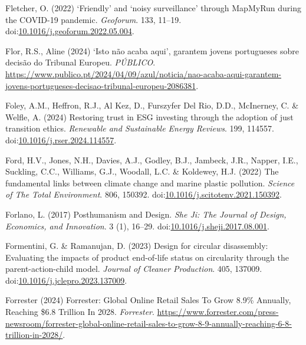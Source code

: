 \documentclass[
  letterpaper,
  DIV=11,
  numbers=noendperiod]{scrartcl}
\newlength{\cslhangindent}
\newenvironment{CSLReferences}[2] %
 {\begin{list}{}{%
  \setlength{\itemindent}{0pt}
  \setlength{\leftmargin}{0pt}
  \setlength{\parsep}{0pt}
  \ifodd #1
   \setlength{\leftmargin}{\cslhangindent}
   \setlength{\itemindent}{-1\cslhangindent}
  \fi
  \setlength{\itemsep}{#2\baselineskip}}}
 {\end{list}}
\begin{document}
\begin{CSLReferences}{0}{1}
Fletcher, O. (2022) {`{Friendly}'} and {`noisy surveillance'} through
{MapMyRun} during the {COVID-19} pandemic. \emph{Geoforum}. 133, 11--19.
doi:\href{https://doi.org/10.1016/j.geoforum.2022.05.004}{10.1016/j.geoforum.2022.05.004}.

Flor, R.S., Aline (2024) {{`Isto n{ã}o acaba aqui'}, garantem jovens
portugueses sobre decis{ã}o do Tribunal Europeu}. \emph{P{Ú}BLICO}.
\url{https://www.publico.pt/2024/04/09/azul/noticia/nao-acaba-aqui-garantem-jovens-portugueses-decisao-tribunal-europeu-2086381}.

Foley, A.M., Heffron, R.J., Al Kez, D., Furszyfer Del Rio, D.D.,
McInerney, C. \& Welfle, A. (2024) Restoring trust in {ESG} investing
through the adoption of just transition ethics. \emph{Renewable and
Sustainable Energy Reviews}. 199, 114557.
doi:\href{https://doi.org/10.1016/j.rser.2024.114557}{10.1016/j.rser.2024.114557}.

Ford, H.V., Jones, N.H., Davies, A.J., Godley, B.J., Jambeck, J.R.,
Napper, I.E., Suckling, C.C., Williams, G.J., Woodall, L.C. \& Koldewey,
H.J. (2022) The fundamental links between climate change and marine
plastic pollution. \emph{Science of The Total Environment}. 806, 150392.
doi:\href{https://doi.org/10.1016/j.scitotenv.2021.150392}{10.1016/j.scitotenv.2021.150392}.

Forlano, L. (2017) Posthumanism and {Design}. \emph{She Ji: The Journal
of Design, Economics, and Innovation}. 3 (1), 16--29.
doi:\href{https://doi.org/10.1016/j.sheji.2017.08.001}{10.1016/j.sheji.2017.08.001}.

Formentini, G. \& Ramanujan, D. (2023) Design for circular disassembly:
{Evaluating} the impacts of product end-of-life status on circularity
through the parent-action-child model. \emph{Journal of Cleaner
Production}. 405, 137009.
doi:\href{https://doi.org/10.1016/j.jclepro.2023.137009}{10.1016/j.jclepro.2023.137009}.

Forrester (2024) Forrester: {Global Online Retail Sales To Grow} 8.9\%
{Annually}, {Reaching} \$6.8 {Trillion In} 2028. \emph{Forrester}.
\url{https://www.forrester.com/press-newsroom/forrester-global-online-retail-sales-to-grow-8-9-annually-reaching-6-8-trillion-in-2028/}.


\end{CSLReferences}
\end{document}
